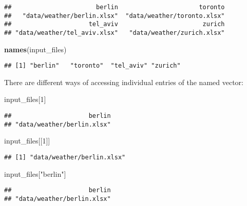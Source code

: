 \documentclass[]{book}
\newenvironment{Shaded}{\begin{snugshade}}{\end{snugshade}}
\newcommand{\DecValTok}[1]{\textcolor[rgb]{0.00,0.00,0.81}{#1}}
\newcommand{\KeywordTok}[1]{\textcolor[rgb]{0.13,0.29,0.53}{\textbf{#1}}}
\newcommand{\NormalTok}[1]{#1}
\newcommand{\StringTok}[1]{\textcolor[rgb]{0.31,0.60,0.02}{#1}}
\begin{document}
\begin{verbatim}
##                       berlin                      toronto 
##   "data/weather/berlin.xlsx"  "data/weather/toronto.xlsx" 
##                     tel_aviv                       zurich 
## "data/weather/tel_aviv.xlsx"   "data/weather/zurich.xlsx"
\end{verbatim}

\begin{Shaded}
\begin{Highlighting}[]
\KeywordTok{names}\NormalTok{(input_files)}
\end{Highlighting}
\end{Shaded}

\begin{verbatim}
## [1] "berlin"   "toronto"  "tel_aviv" "zurich"
\end{verbatim}

There are different ways of accessing individual entries of the named vector:

\begin{Shaded}
\begin{Highlighting}[]
\NormalTok{input_files[}\DecValTok{1}\NormalTok{]}
\end{Highlighting}
\end{Shaded}

\begin{verbatim}
##                     berlin 
## "data/weather/berlin.xlsx"
\end{verbatim}

\begin{Shaded}
\begin{Highlighting}[]
\NormalTok{input_files[[}\DecValTok{1}\NormalTok{]]}
\end{Highlighting}
\end{Shaded}

\begin{verbatim}
## [1] "data/weather/berlin.xlsx"
\end{verbatim}

\begin{Shaded}
\begin{Highlighting}[]
\NormalTok{input_files[}\StringTok{"berlin"}\NormalTok{]}
\end{Highlighting}
\end{Shaded}

\begin{verbatim}
##                     berlin 
## "data/weather/berlin.xlsx"
\end{verbatim}
\end{document}
